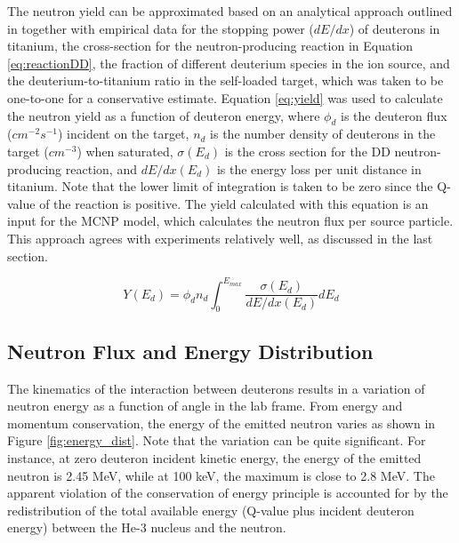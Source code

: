\documentclass[review]{elsarticle}
\begin{document}
The neutron yield can be approximated based on an analytical approach outlined in \cite{CRC} together with empirical data for the stopping power ($dE/dx$) of deuterons in titanium, the cross-section for the neutron-producing reaction in Equation \ref{eq:reactionDD}, the fraction of different deuterium species in the ion source, and the deuterium-to-titanium ratio in the self-loaded target, which was taken to be one-to-one for a conservative estimate. Equation \ref{eq:yield} was used to calculate the neutron yield as a function of deuteron energy, where $\phi_d$ is the deuteron flux ($cm^{-2}s^{-1}$) incident on the target, $n_d$ is the number density of deuterons in the target ($cm^{-3}$) when saturated, $\sigma(E_d)$ is the cross section for the DD neutron-producing reaction, and $dE/dx(E_d)$ is the energy loss per unit distance in titanium. Note that the lower limit of integration is taken to be zero since the Q-value of the reaction is positive. The yield calculated with this equation is an input for the MCNP \cite{MCNP} model, which calculates the neutron flux per source particle. This approach agrees with experiments relatively well, as discussed in the last section. 

\begin{equation} \label{eq:yield}
Y(E_d)=\phi_d n_d \int_{0}^{E_{max}} \frac{\sigma(E_d)}{dE/dx(E_d)}dE_d
\end{equation}

	
\subsection{Neutron Flux and Energy Distribution}

The kinematics of the interaction between deuterons results in a variation of neutron energy as a function of angle in the lab frame. From energy and momentum conservation, the energy of the emitted neutron varies as shown in Figure \ref{fig:energy_dist}. Note that the variation can be quite significant. For instance, at zero deuteron incident kinetic energy, the energy of the emitted neutron is 2.45 MeV, while at 100 keV, the maximum is close to 2.8 MeV. The apparent violation of the conservation of energy principle is accounted for by the redistribution of the total available energy (Q-value plus incident deuteron energy) between the He-3 nucleus and the neutron. 
\end{document}
